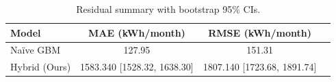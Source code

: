 \begin{table}[h!]
  \centering
  \caption{Residual summary with bootstrap 95\% CIs.}
  \label{tab:residual_summary}
  \begin{tabular}{@{}lccc@{}}
  \toprule
  Model & MAE (kWh/month) & RMSE (kWh/month) \\
  \midrule
  Naïve GBM & 127.95 & 151.31 \\
  Hybrid (Ours) & 1583.340 [1528.32, 1638.30] & 1807.140 [1723.68, 1891.74] \\
  \bottomrule
  \end{tabular}
\end{table}
